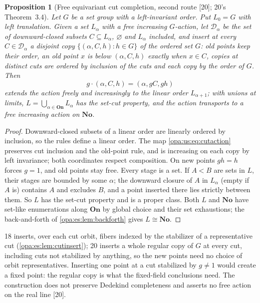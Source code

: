 \documentclass[11pt,oneside]{article}
\numberwithin{equation}{section}
\newtheorem{proposition}[proposition]{Proposition}
\theoremstyle{definition}
\theoremstyle{remark}
\newcommand{\No}{\mathbf{No}}
\newcommand{\src}[1]{\textup{\textsf{\small[#1]}}}
\newcommand{\On}{\mathbf{On}}
\begin{document}
\begin{proposition}[Free equivariant cut completion, second route \src{20}; 20's Theorem~3.4]\label{opa:us:prop:cutcopies}
Let $G$ be a set group with a left-invariant order. Put $L_0=G$ with left translation. Given a set $L_\alpha$ with a free increasing
$G$-action, let $\mathcal D_\alpha$ be the set of downward-closed subsets $C\subseteq L_\alpha$, $\varnothing$ and $L_\alpha$ included, and insert
at every $C\in\mathcal D_\alpha$ a disjoint copy $\{(\alpha,C,h):h\in G\}$ of the ordered set $G$: old points keep their order, an old point $x$ is
below $(\alpha,C,h)$ exactly when $x\in C$, copies at distinct cuts are ordered by inclusion of the cuts and each copy by the order of $G$.
Then
\begin{equation}\label{opa:us:eq:cutaction}
 g\cdot(\alpha,C,h)=(\alpha,gC,gh)
\end{equation}
extends the action freely and increasingly to the linear order $L_{\alpha+1}$; with unions at limits, $L=\bigcup_{\alpha\in\On}L_\alpha$ has the
set-cut property, and the action transports to a free increasing action on $\No$.
\end{proposition}
\begin{proof}
Downward-closed subsets of a linear order are linearly ordered by inclusion, so the rules define a linear order. The map
\eqref{opa:us:eq:cutaction} preserves cut inclusion and the old-point rule, and is increasing on each copy by left invariance; both coordinates
respect composition. On new points $gh=h$ forces $g=1$, and old points stay free. Every stage is a set. If $A<B$ are sets in $L$, their stages
are bounded by some $\alpha$; the downward closure of $A$ in $L_\alpha$ (empty if $A$ is) contains $A$ and excludes $B$, and a point inserted
there lies strictly between them. So $L$ has the set-cut property and is a proper class. Both $L$ and $\No$ have set-like enumerations
along $\On$ by global choice and their set exhaustions; the back-and-forth of \cref{opa:es:lem:backforth} gives $L\cong\No$.
\end{proof}

18 inserts, over each cut orbit, fibers indexed by the stabilizer of a representative cut (\cref{opa:es:lem:cutinsert}); 20 inserts a whole
regular copy of $G$ at every cut, including cuts not stabilized by anything, so the new points need no choice of orbit representatives.
Inserting one point at a cut stabilized by $g\ne1$ would create a fixed point: the regular copy is what the fixed-field conclusions need.
The construction does not preserve Dedekind completeness and asserts no free action on the real line \src{20}.
\end{document}
